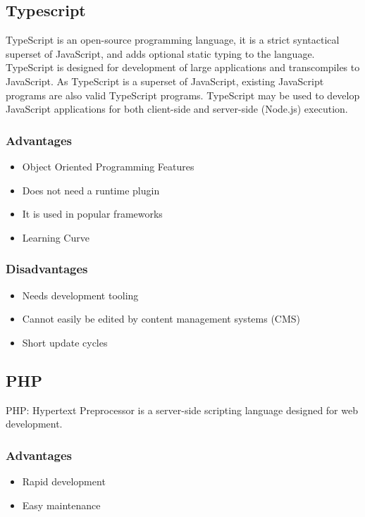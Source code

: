 \documentclass[a4paper, hidelinks, 12pt]{report}
\begin{document}
\subsection{Typescript}
	TypeScript is an open-source programming language, it is a strict syntactical superset of JavaScript, and adds optional static typing to the language. TypeScript is designed for development of large applications and transcompiles to JavaScript. As TypeScript is a superset of JavaScript, existing JavaScript programs are also valid TypeScript programs. TypeScript may be used to develop JavaScript applications for both client-side and server-side (Node.js) execution.\\

\subsubsection{Advantages}
\begin{itemize}
\item{} Object Oriented Programming Features
\item{} Does not need a runtime plugin
\item{} It is used in popular frameworks
\item{} Learning Curve
\end{itemize}
\subsubsection{Disadvantages}
\begin{itemize}
\item{} Needs development tooling
\item{} Cannot easily be edited by content management systems (CMS)
\item{} Short update cycles
\end{itemize}

\subsection{PHP}
PHP: Hypertext Preprocessor is a server-side scripting language designed for web development.

\subsubsection{Advantages}
\begin{itemize}
\item{} Rapid development
\item{} Easy maintenance
\end{itemize}
\end{document}
